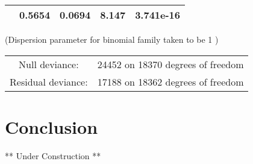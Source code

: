 \documentclass[]{book}
\theoremstyle{definition}
\theoremstyle{definition}
\theoremstyle{remark}
\begin{document}
\begin{longtable}[]{@{}ccccc@{}}
\begin{minipage}[t]{0.30\columnwidth}
\end{minipage} & \begin{minipage}[t]{0.13\columnwidth}\centering\strut
0.5654\strut
\end{minipage} & \begin{minipage}[t]{0.16\columnwidth}\centering\strut
0.0694\strut
\end{minipage} & \begin{minipage}[t]{0.12\columnwidth}\centering\strut
8.147\strut
\end{minipage} & \begin{minipage}[t]{0.12\columnwidth}\centering\strut
3.741e-16\strut
\end{minipage}\tabularnewline
\bottomrule
\end{longtable}

(Dispersion parameter for binomial family taken to be 1 )

\begin{longtable}[]{@{}cl@{}}
\toprule
\begin{minipage}[t]{0.25\columnwidth}\centering\strut
Null deviance:\strut
\end{minipage} & \begin{minipage}[t]{0.35\columnwidth}\raggedright\strut
24452 on 18370 degrees of freedom\strut
\end{minipage}\tabularnewline
\begin{minipage}[t]{0.25\columnwidth}\centering\strut
Residual deviance:\strut
\end{minipage} & \begin{minipage}[t]{0.35\columnwidth}\raggedright\strut
17188 on 18362 degrees of freedom\strut
\end{minipage}\tabularnewline
\bottomrule
\end{longtable}

\hypertarget{conclusion}{\chapter{Conclusion}\label{conclusion}}

** Under Construction **


\end{document}
